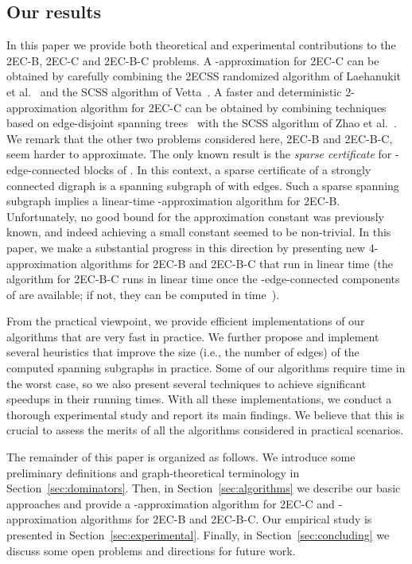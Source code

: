 \documentclass[11pt]{article}
\begin{document}
\subsection{Our results}
\label{sec:our-results}
In this paper we provide both theoretical and experimental contributions to the \textsf{2EC-B}, \textsf{2EC-C} and \textsf{2EC-B-C} problems.
A -approximation for \textsf{2EC-C} can be obtained by carefully combining the \textsf{2ECSS} randomized algorithm of Laehanukit et al.~\cite{LGS:MSCS:2012} and the \textsf{SCSS} algorithm of Vetta~\cite{Vetta:MSCS:2001}. A faster and deterministic 2-approximation algorithm for \textsf{2EC-C} can be obtained by combining techniques based on edge-disjoint spanning trees~\cite{edge-disjoint:edmonds,st:t} with the \textsf{SCSS} algorithm of  Zhao et al.~\cite{ZNI:MSCS:2003}.
We remark that the other two problems considered here, \textsf{2EC-B} and \textsf{2EC-B-C}, seem harder to approximate.
The only known result is the \emph{sparse certificate} for -edge-connected blocks of \cite{2ECB}.
In this context, a sparse certificate  of a strongly connected digraph  is a spanning subgraph of  with  edges.
Such a sparse spanning subgraph implies a linear-time -approximation algorithm for \textsf{2EC-B}.
Unfortunately, no good bound for the approximation constant was previously known, and indeed achieving a small constant seemed to be non-trivial.
In this paper, we make a substantial progress in this direction
by presenting new 4-approximation algorithms for \textsf{2EC-B} and \textsf{2EC-B-C} that run in linear time (the algorithm for \textsf{2EC-B-C} runs in linear time once the -edge-connected components of  are available; if not, they can be computed in  time~\cite{2CC:HenzingerKL14}).

From the practical viewpoint, we provide efficient implementations of our algorithms that are very fast in practice.
We further propose and implement several heuristics that improve the size (i.e., the number of edges) of the computed spanning subgraphs in practice.
Some of our algorithms require  time in the worst case, so we also present several techniques to achieve significant speedups in their running times.
With all these implementations, we conduct a thorough experimental study and report its main findings. We believe that this is crucial to assess the merits of all the algorithms considered in practical scenarios.

The remainder of this paper is organized as follows.
We introduce some preliminary definitions and graph-theoretical terminology in Section~\ref{sec:dominators}.
Then, in Section~\ref{sec:algorithms} we describe our basic approaches and provide a -approximation algorithm for \textsf{2EC-C} and -approximation algorithms for \textsf{2EC-B} and \textsf{2EC-B-C}.
Our empirical study is presented in Section~\ref{sec:experimental}.
Finally, in Section~\ref{sec:concluding} we discuss some open problems and directions for future work.
\end{document}
